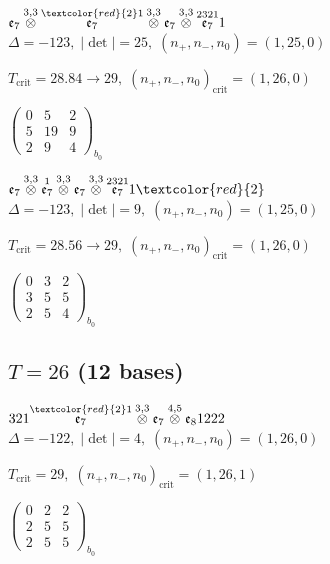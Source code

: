 \documentclass[10pt]{article}
\begin{document}
$\mathfrak{e}_7\overset{3,3}{\otimes}\overset{\textcolor{red}{2}1}{\mathfrak{e}_7}\overset{3,3}{\otimes}\mathfrak{e}_7\overset{3,3}{\otimes}\overset{2321}{\mathfrak{e}_7}1$ \quad $\Delta=-123,\; |\det|=25,\; (n_+,n_-,n_0)=(1,25,0)$

\hspace{1em}$T_{\text{crit}}=28.84 \to 29,\; (n_+,n_-,n_0)_{\text{crit}}=(1,26,0)$

\hspace{2em}$\left(\begin{smallmatrix}0 & 5 & 2 \\ 5 & 19 & 9 \\ 2 & 9 & 4\end{smallmatrix}\right)_{\!b_0}$

$\mathfrak{e}_7\overset{3,3}{\otimes}\overset{1}{\mathfrak{e}_7}\overset{3,3}{\otimes}\mathfrak{e}_7\overset{3,3}{\otimes}\overset{2321}{\mathfrak{e}_7}1\textcolor{red}{2}$ \quad $\Delta=-123,\; |\det|=9,\; (n_+,n_-,n_0)=(1,25,0)$

\hspace{1em}$T_{\text{crit}}=28.56 \to 29,\; (n_+,n_-,n_0)_{\text{crit}}=(1,26,0)$

\hspace{2em}$\left(\begin{smallmatrix}0 & 3 & 2 \\ 3 & 5 & 5 \\ 2 & 5 & 4\end{smallmatrix}\right)_{\!b_0}$


\subsection*{$T = 26$ \quad (12 bases)}
\smallskip

$321\overset{\textcolor{red}{2}1}{\mathfrak{e}_7}\overset{3,3}{\otimes}\mathfrak{e}_7\overset{4,5}{\otimes}\mathfrak{e}_81222$ \quad $\Delta=-122,\; |\det|=4,\; (n_+,n_-,n_0)=(1,26,0)$

\hspace{1em}$T_{\text{crit}}=29,\; (n_+,n_-,n_0)_{\text{crit}}=(1,26,1)$

\hspace{2em}$\left(\begin{smallmatrix}0 & 2 & 2 \\ 2 & 5 & 5 \\ 2 & 5 & 5\end{smallmatrix}\right)_{\!b_0}$
\end{document}
